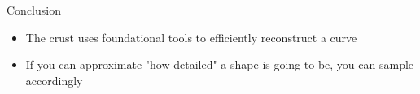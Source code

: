 \begin{frame}{Conclusion}
	\begin{itemize}
		\item The crust uses foundational tools to efficiently reconstruct a curve
		\item If you can approximate "how detailed" a shape is going to be, you can sample accordingly
	\end{itemize}
	
\end{frame}
